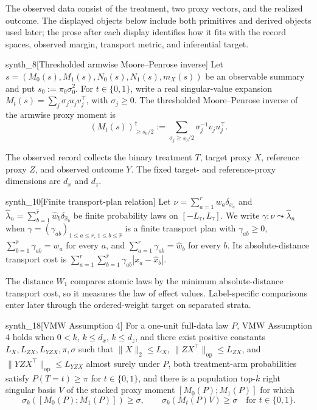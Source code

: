 The observed data consist of the treatment, two proxy vectors, and the realized outcome. The displayed objects below include both primitives and derived objects used later; the prose after each display identifies how it fits with the record spaces, observed margin, transport metric, and inferential target.

\begin{definitionv}{synth_8}[Thresholded armwise Moore--Penrose inverse]
Let \(s=(M_0(s),M_1(s),N_0(s),N_1(s),m_X(s))\) be an observable summary and put \(s_0:=\pi_0\sigma_0^2\). For \(t\in\{0,1\}\), write a real singular-value expansion \(M_t(s)=\sum_j \sigma_j u_jv_j^\top\), with \(\sigma_j\ge0\). The thresholded Moore--Penrose inverse of the armwise proxy moment is\[ (M_t(s))^\dagger_{\ge s_0/2}:=\sum_{\sigma_j\ge s_0/2}\sigma_j^{-1}v_ju_j^\top.\]
\end{definitionv}

The observed record collects the binary treatment \(T\), target proxy \(X\), reference proxy \(Z\), and observed outcome \(Y\). The fixed target- and reference-proxy dimensions are \(d_x\) and \(d_z\).

\begin{definitionv}{synth_10}[Finite transport-plan relation]
Let \(\nu=\sum_{a=1}^r w_a\delta_{x_a}\) and \(\widehat\lambda_n=\sum_{b=1}^{\widehat r}\widehat w_b\delta_{\widehat x_b}\) be finite probability laws on \([-L_\tau,L_\tau]\). We write \(\gamma:\nu\leadsto\widehat\lambda_n\) when \(\gamma=(\gamma_{ab})_{1\le a\le r,\,1\le b\le\widehat r}\) is a finite transport plan with \(\gamma_{ab}\ge0\), \(\sum_{b=1}^{\widehat r}\gamma_{ab}=w_a\) for every \(a\), and \(\sum_{a=1}^{r}\gamma_{ab}=\widehat w_b\) for every \(b\). Its absolute-distance transport cost is \(\sum_{a=1}^{r}\sum_{b=1}^{\widehat r}\gamma_{ab}|x_a-\widehat x_b|\).
\end{definitionv}

The distance \(W_1\) compares atomic laws by the minimum absolute-distance transport cost, so it measures the law of effect values. Label-specific comparisons enter later through the ordered-weight target on separated strata.

\begin{definitionv}{synth_18}[VMW Assumption 4]
For a one-unit full-data law \(P\), VMW Assumption 4 holds when \(0<k\), \(k\le d_x\), \(k\le d_z\), and there exist positive constants \(L_X,L_{ZX},L_{YZX},\pi,\sigma\) such that \(\|X\|_2\le L_X\), \(\|ZX^\top\|_{\mathrm{op}}\le L_{ZX}\), and \(\|YZX^\top\|_{\mathrm{op}}\le L_{YZX}\) almost surely under \(P\), both treatment-arm probabilities satisfy \(P(T=t)\ge\pi\) for \(t\in\{0,1\}\), and there is a population top-\(k\) right singular basis \(V\) of the stacked proxy moment \([M_0(P);M_1(P)]\) for which
\[
\sigma_k([M_0(P);M_1(P)])\ge\sigma,
\qquad
\sigma_k(M_t(P)V)\ge\sigma\quad\text{for }t\in\{0,1\}.
\]
\end{definitionv}

